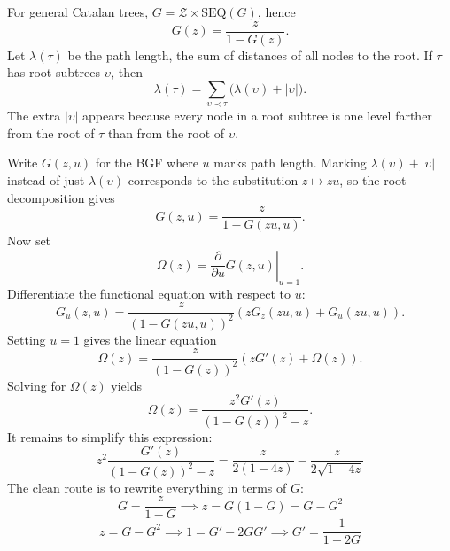 
For general Catalan trees, $G = \mathcal{Z}\times\mathrm{SEQ}(G)$, hence
\begin{equation*}
    G(z) = \frac{z}{1-G(z)}.
\end{equation*}
Let $\lambda(\tau)$ be the path length, the sum of distances of all nodes to the root. If
$\tau$ has root subtrees $\upsilon$, then
\begin{equation*}
    \lambda(\tau)=\sum_{\upsilon\prec\tau}\bigl(\lambda(\upsilon)+|\upsilon|\bigr).
\end{equation*}
The extra $|\upsilon|$ appears because every node in a root subtree is one level farther from
the root of $\tau$ than from the root of $\upsilon$.

Write $G(z,u)$ for the BGF where $u$ marks path length. Marking
$\lambda(\upsilon)+|\upsilon|$ instead of just $\lambda(\upsilon)$ corresponds to the substitution
$z\mapsto zu$, so the root decomposition gives
\begin{equation*}
    G(z,u)=\frac{z}{1-G(zu,u)}.
\end{equation*}
Now set
\begin{equation*}
    \Omega(z)=\left.\frac{\partial}{\partial u}G(z,u)\right|_{u=1}.
\end{equation*}
Differentiate the functional equation with respect to $u$:
\begin{equation*}
    G_u(z,u)
        =
        \frac{z}{(1-G(zu,u))^2}
        \left(zG_z(zu,u)+G_u(zu,u)\right).
\end{equation*}
Setting $u=1$ gives the linear equation
\begin{equation*}
    \Omega(z)=\frac{z}{(1-G(z))^2}\left(zG'(z)+\Omega(z)\right).
\end{equation*}
Solving for $\Omega(z)$ yields
\begin{equation*}
    \Omega(z)
        = \frac{z^2G'(z)}{(1-G(z))^2-z}.
\end{equation*}
It remains to simplify this expression:
\begin{equation*}
    z^{2} \frac{G'(z)}{(1 - G(z))^{2} - z} = \frac{z}{2(1 - 4z)} - \frac{z}{2\sqrt{1 - 4z}}
\end{equation*}
The clean route is to rewrite everything in terms of $G$:
\begin{equation*}
    G = \frac{z}{1 - G} \implies z = G(1 - G) = G - G^{2}
\end{equation*}
\begin{equation*}
    z = G - G^{2} \implies 1 = G' - 2GG' \implies G' = \frac{1}{1 - 2G}
\end{equation*}
